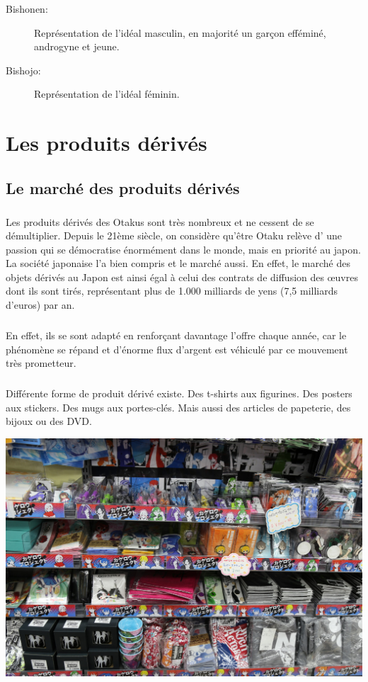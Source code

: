 \begin{description}
	\item[Bishonen:] Représentation de l'idéal masculin, en majorité un garçon
		efféminé, androgyne et jeune.
	\item[Bishojo:] Représentation de l'idéal féminin.
\end{description}

\chapter{Les produits dérivés}

\section{Le marché des produits dérivés}

\paragraph{} Les produits dérivés des Otakus sont très nombreux et ne cessent
de se démultiplier. Depuis le 21ème siècle, on considère qu'être Otaku relève
d' une passion qui se démocratise énormément dans le monde, mais en priorité au
japon. La société japonaise l'a bien compris et le marché aussi. En effet, le
marché des objets dérivés au Japon est ainsi égal à celui des contrats de
diffusion des œuvres dont ils sont tirés, représentant plus de 1.000 milliards
de yens (7,5 milliards d'euros) par an.

\paragraph{} En effet, ils se sont adapté en renforçant davantage l'offre
chaque année, car le phénomène se répand et d'énorme flux d'argent est véhiculé
par ce mouvement très prometteur.

\paragraph{} Différente forme de produit dérivé existe. Des t-shirts aux
figurines. Des posters aux stickers. Des mugs aux portes-clés. Mais aussi des
articles de papeterie, des bijoux ou des DVD.

\begin{center}
	\includegraphics[scale=0.15]{produit.jpg}
\end{center}

